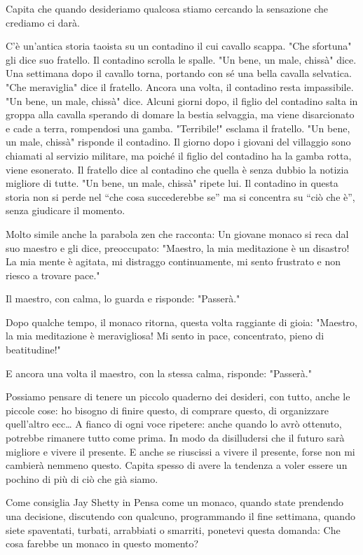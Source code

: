 \documentclass[12pt]{book} %
\begin{document}
\begin{mdframed}[linewidth=1pt]
Capita che quando desideriamo qualcosa stiamo cercando la sensazione che crediamo ci darà. 

C'è un'antica storia taoista su un contadino il cui cavallo scappa.
"Che sfortuna" gli dice suo fratello. Il contadino scrolla le spalle.
"Un bene, un male, chissà" dice. Una settimana dopo il cavallo torna,
portando con sé una bella cavalla selvatica. "Che meraviglia" dice il
fratello. Ancora una volta, il contadino resta impassibile. "Un bene, un male,
chissà" dice. Alcuni giorni dopo, il figlio del contadino salta in groppa alla cavalla sperando di
domare la bestia selvaggia, ma viene disarcionato e cade a terra, rompendosi una gamba.
"Terribile!" esclama il fratello. "Un bene, un male,
chissà" risponde il contadino. Il giorno dopo i giovani del villaggio sono chiamati al servizio
militare, ma poiché il figlio del contadino ha la gamba rotta, viene esonerato. Il fratello dice al contadino che
quella è senza dubbio la notizia migliore di tutte. "Un bene, un male,
chissà" ripete lui. Il contadino in questa storia non si perde nel “che cosa succederebbe se” ma
si concentra su “ciò che è”, senza giudicare il momento.

Molto simile anche la parabola zen che racconta:
Un giovane monaco si reca dal suo maestro e gli dice, preoccupato:
"Maestro, la mia meditazione è un disastro! La mia mente è agitata, mi distraggo continuamente, mi sento frustrato e non riesco a trovare pace."

Il maestro, con calma, lo guarda e risponde:
"Passerà."

Dopo qualche tempo, il monaco ritorna, questa volta raggiante di gioia:
"Maestro, la mia meditazione è meravigliosa! Mi sento in pace, concentrato, pieno di beatitudine!"

E ancora una volta il maestro, con la stessa calma, risponde:
"Passerà."


Possiamo pensare di tenere un piccolo quaderno dei desideri, con tutto, anche le piccole cose:
ho bisogno di finire questo, di comprare questo, di organizzare quell'altro ecc…
A fianco di ogni voce ripetere: anche quando lo avrò ottenuto, potrebbe rimanere tutto come prima.
In modo da disilludersi che il futuro sarà migliore e vivere il presente.
E anche se riuscissi a vivere il presente, forse non mi cambierà nemmeno questo.
Capita spesso di avere la tendenza a voler essere un pochino di più di ciò che già siamo.

Come consiglia Jay Shetty in Pensa come un monaco, quando state prendendo una
decisione, discutendo con qualcuno, programmando il fine settimana, quando siete spaventati, turbati, arrabbiati o
smarriti, ponetevi questa domanda: Che cosa farebbe un monaco in questo momento? 


\end{mdframed}
\end{document}
